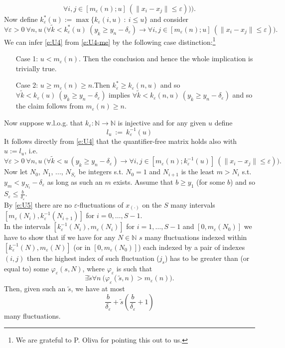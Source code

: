 \documentclass[1p]{elsarticle}
\newcommand{\NN}{\ensuremath{\mathbb{N}}}
\theoremstyle{plain}
\theoremstyle{definition}
\theoremstyle{remark}
\renewcommand{\phi}{\varphi}
\renewcommand{\epsilon}{\varepsilon}
\theoremstyle{definition}
\begin{document}
{\[ \forall i,j\in[m_\epsilon(n);u]\ (\|x_i-x_j\|\leq \epsilon) \Big) \bigg).
\tag{$*$}\label{e:U4-me}\]
Now define $k^*_\epsilon(u):=\max\{k_\epsilon(i,u)\ :\ i\leq u\}$ and consider
\[
\forall \epsilon>0\ \forall n,u\ \Big( \forall \tilde k< k^*_\epsilon(u)\ (y_{\tilde k}\geq y_n-\delta_\epsilon)\rightarrow 
 \forall i,j\in[m_\epsilon(n);u]\ (\|x_i-x_j\|\leq \epsilon) \Big).
\tag{$**$}\label{e:U4}\]
We can infer \eqref{e:U4} from \eqref{e:U4-me} by the following case 
distinction:\footnote{We are grateful to P. Oliva for pointing this out to us.}
\begin{itemize}
\item[Case]  1: $u<m_\epsilon(n)$. Then the conclusion and hence the whole implication is trivially true.
\item[Case]  2: $u\geq m_\epsilon(n) \geq n$.Then $k^*_\epsilon\geq k_\epsilon(n,u)$ and so $\forall \tilde k< k_\epsilon(u)\ (y_{\tilde k}\geq y_n-\delta_\epsilon)$ implies $\forall \tilde k< k_\epsilon(n,u)\ (y_{\tilde k}\geq y_n-\delta_\epsilon)$ and so the claim follows from $m_\epsilon(n) \geq n$.
\end{itemize}

Now suppose w.l.o.g. that $k_\epsilon:\NN\to\NN$ is injective and for any given $u$ define
\[
l_u\ :=\ k_\epsilon^{-1}(u)
\]
It follows directly from \eqref{e:U4} that the quantifier-free matrix holds also with $u:=l_u$, i.e.
\[
\forall \epsilon>0\ \forall n,u\ \Big( \forall \tilde k< u\ (y_{\tilde k}\geq y_n-\delta_\epsilon)\rightarrow 
 \forall i,j\in[m_\epsilon(n);k_\epsilon^{-1}(u)]\ (\|x_i-x_j\|\leq \epsilon) \Big).
\tag{-}\label{e:U5}\]
Now let $N_0$, $N_1$, ..., $N_{S_\epsilon}$ be integers s.t. $N_0=1$ and $N_{i+1}$ is the least $m>N_i$ s.t. $y_m<y_{N_i}-\delta_\epsilon$ as long as such an $m$ exists.
Assume that $b\geq y_1$ (for some $b$) and so $S_\epsilon\leq\frac{b}{\delta_\epsilon}$.\\
By \eqref{e:U5} there are no $\epsilon$-fluctuations of $x_{(\cdot)}$ on the $S$ many intervals $[m_\epsilon(N_i),k^{-1}_\epsilon(N_{i+1})]$ for $i=0,\ldots,S-1$.\\
In the intervals $[k^{-1}_\epsilon(N_{i}),m_\epsilon(N_i)]$ for $i=1,\ldots,S-1$ and $[0,m_\epsilon(N_0)]$ we have to show that if we have for any $N\in\NN$ $s$ many
fluctuations indexed within $[k^{-1}_\epsilon(N),m_\epsilon(N)]$ (or in $[0,m_\epsilon(N_0)]$) each indexed by a pair of indexes $(i,j)$ then the highest index of such fluctuation ($j_s$) has to be greater than (or equal to) some $\phi_\epsilon(s,N)$, where $\phi_\epsilon$ is such that
\[
\exists \tilde s\forall n\ \big(\phi_\epsilon(\tilde s,n)>m_\epsilon(n)\big).
\]
Then, given such an $\tilde s$, we have at most
\[
\frac{b}{\delta_\epsilon}+\tilde s\left(\frac{b}{\delta_\epsilon}+1\right)
\]
many fluctuations.


}
\end{document}
